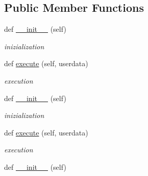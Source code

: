 \subsection*{Public Member Functions}
\begin{DoxyCompactItemize}
\item 
\mbox{\label{classstate__machine_1_1Normal_acdbc35a37d0350d7805a628048bc3bed}} 
def \hyperlink{classstate__machine_1_1Normal_acdbc35a37d0350d7805a628048bc3bed}{\+\_\+\+\_\+init\+\_\+\+\_\+} (self)
\begin{DoxyCompactList}\small\item\em inizialization \end{DoxyCompactList}\item 
\mbox{\label{classstate__machine_1_1Normal_a2930df5f4890ec4b47b2a8e18f9bff08}} 
def \hyperlink{classstate__machine_1_1Normal_a2930df5f4890ec4b47b2a8e18f9bff08}{execute} (self, userdata)
\begin{DoxyCompactList}\small\item\em execution \end{DoxyCompactList}\item 
\mbox{\label{classstate__machine_1_1Normal_acdbc35a37d0350d7805a628048bc3bed}} 
def \hyperlink{classstate__machine_1_1Normal_acdbc35a37d0350d7805a628048bc3bed}{\+\_\+\+\_\+init\+\_\+\+\_\+} (self)
\begin{DoxyCompactList}\small\item\em inizialization \end{DoxyCompactList}\item 
\mbox{\label{classstate__machine_1_1Normal_a2930df5f4890ec4b47b2a8e18f9bff08}} 
def \hyperlink{classstate__machine_1_1Normal_a2930df5f4890ec4b47b2a8e18f9bff08}{execute} (self, userdata)
\begin{DoxyCompactList}\small\item\em execution \end{DoxyCompactList}\item 
\mbox{\label{classstate__machine_1_1Normal_acdbc35a37d0350d7805a628048bc3bed}} 
def \hyperlink{classstate__machine_1_1Normal_acdbc35a37d0350d7805a628048bc3bed}{\+\_\+\+\_\+init\+\_\+\+\_\+} (self)

\end{DoxyCompactItemize}
